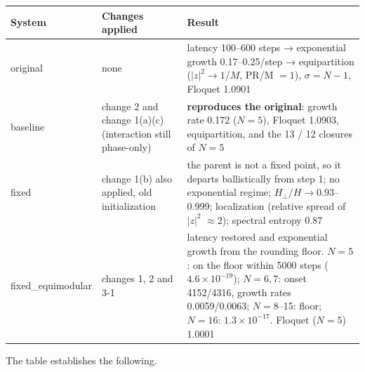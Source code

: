 \documentclass[
  10pt,
  a4paper,
]{article}
\newcounter{none} %
\begin{document}
{\def\LTcaptype{none} %
\begin{longtable}[]{@{}
  >{\raggedright\arraybackslash}p{}
  >{\raggedright\arraybackslash}p{}
  >{\raggedright\arraybackslash}p{}@{}}
\toprule\noalign{}
\begin{minipage}[b]{\linewidth}\raggedright
System
\end{minipage} & \begin{minipage}[b]{\linewidth}\raggedright
Changes applied
\end{minipage} & \begin{minipage}[b]{\linewidth}\raggedright
Result
\end{minipage} \\
\midrule\noalign{}
\endhead
\bottomrule\noalign{}
\endlastfoot
original & none & latency 100--600 steps → exponential growth
0.17--0.25/step → equipartition (\(|z|^2\to1/M\), PR/M \(=1\)),
\(\sigma=N-1\), Floquet 1.0901 \\
baseline & change 2 and change 1(a)(c) (interaction still phase-only) &
\textbf{reproduces the original}: growth rate 0.172 (\(N=5\)), Floquet
1.0903, equipartition, and the 13 / 12 closures of \(N=5\) \\
fixed & change 1(b) also applied, old initialization & the parent is not
a fixed point, so it departs ballistically from step 1; no exponential
regime; \(H_\perp/H\to0.93\)--0.999; localization (relative spread of
\(|z|^2\) \(\approx2\)); spectral entropy 0.87 \\
fixed\_equimodular & changes 1, 2 and 3-1 & latency restored and
exponential growth from the rounding floor. \(N=5\): on the floor within
5000 steps (\(4.6\times10^{-19}\)); \(N=6,7\): onset 4152/4316, growth
rates 0.0059/0.0063; \(N=8\)--15: floor; \(N=16\):
\(1.3\times10^{-17}\). Floquet (\(N=5\)) 1.0001 \\
\end{longtable}
}

The table establishes the following.
\end{document}
